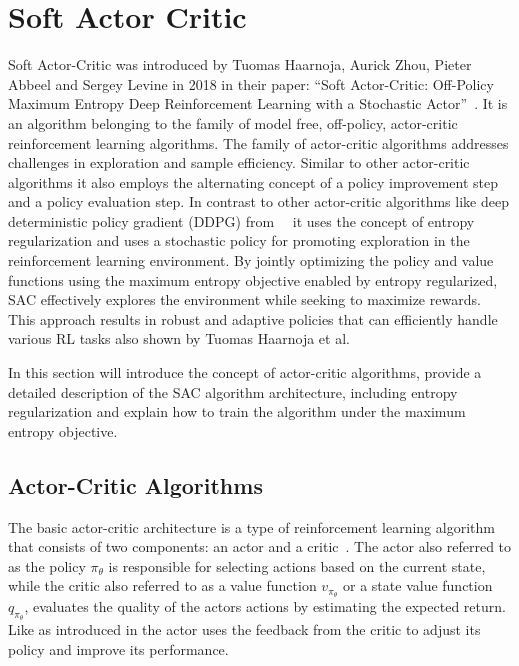 \section{Soft Actor Critic}\label{sec:SAC}

Soft Actor-Critic was introduced by Tuomas Haarnoja, Aurick Zhou, Pieter Abbeel and
Sergey Levine in 2018 in their paper: ``Soft Actor-Critic: Off-Policy Maximum Entropy Deep Reinforcement Learning
with a Stochastic Actor''~\cite{SAC_Paper}. It is an algorithm belonging to the family of model free, off-policy, actor-critic reinforcement learning algorithms. The family of actor-critic algorithms addresses challenges in exploration and sample efficiency. Similar to  other actor-critic algorithms it also employs the alternating concept of a policy improvement step and a policy evaluation step. In contrast to other actor-critic algorithms like deep deterministic policy gradient (DDPG) from~\cite{DPG_Paper}~\cite{DDPG_Paper} it uses the concept of entropy regularization and uses a stochastic policy for promoting exploration in the reinforcement learning environment. 
By jointly optimizing the policy and value functions using the maximum entropy objective enabled by entropy regularized, SAC effectively explores the environment while seeking to maximize rewards. This approach results in robust and adaptive policies that can efficiently handle various RL tasks also shown by Tuomas Haarnoja et al.~\cite{SAC_Applications_Paper}

In this section will introduce the concept of actor-critic algorithms, provide a detailed description of the SAC algorithm architecture, including entropy regularization and explain how to train the algorithm under the maximum entropy objective. 

\subsection{Actor-Critic Algorithms}

The basic actor-critic architecture is a type of reinforcement learning algorithm that consists of two components: an actor and a critic~\cite{Actor_Critic_Algorithms}. The actor also referred to as the policy $\pi_\theta$ is responsible for selecting actions based on the current state, while the critic also referred to as a value function $v_{\pi_\theta}$ or a state value function $q_{\pi_\theta}$, evaluates the quality of the actors actions by estimating the expected return. Like as introduced in  the actor uses the feedback from the critic to adjust its policy and improve its performance.

